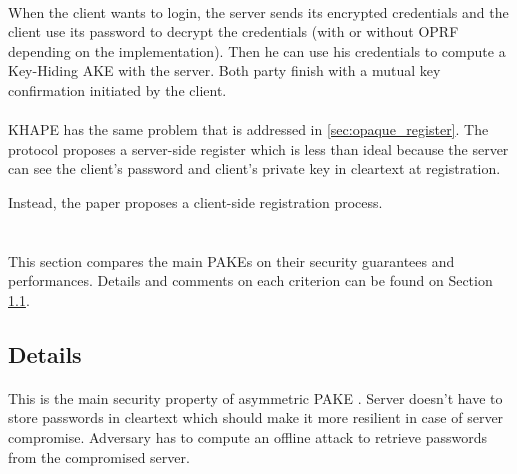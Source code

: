 \documentclass[../report.tex]{subfiles}
\begin{document}
\paragraph{}

When the client wants to login, the server sends its encrypted credentials and the client use its password to decrypt the credentials (with or without OPRF depending on the implementation). Then he can use his credentials to compute a Key-Hiding AKE with the server.
Both party finish with a mutual key confirmation initiated by the client.


\paragraph{}
KHAPE has the same problem that is addressed in \ref{sec:opaque_register}.
The protocol proposes a server-side register which is less than ideal because the server can see the client’s password and client's private key in cleartext at registration.

Instead, the paper proposes a client-side registration process.






\section{}

This section compares the main PAKEs on their security guarantees and performances. Details and comments on each criterion can be found on Section \ref{sec:comparison_details}.

 
\subsection{Details} \label{sec:comparison_details}



\paragraph{}
This is the main security property of asymmetric PAKE \cite{aPAKE_Formalized}. Server doesn't have to store passwords in cleartext which should make it more resilient in case of server compromise. Adversary has to compute an offline attack to retrieve passwords from the compromised server.
\end{document}
